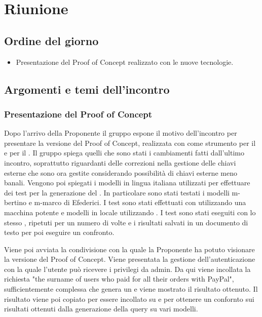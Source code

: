 \section{Riunione}
\subsection{Ordine del giorno}
\begin{itemize}
	\item Presentazione del Proof of Concept realizzato con le nuove tecnologie.
\end{itemize}

\subsection{Argomenti e temi dell'incontro}

\subsubsection{Presentazione del Proof of Concept}

\par Dopo l'arrivo della Proponente il gruppo espone il motivo dell'incontro per presentare la versione del Proof of Concept, realizzata con  come strumento per il  e  per il .
Il gruppo spiega quelli che sono stati i cambiamenti fatti dall'ultimo incontro, soprattutto riguardanti delle correzioni nella gestione delle chiavi esterne che sono ora gestite considerando possibilità di chiavi esterne meno banali.
Vengono poi spiegati i modelli in lingua italiana utilizzati per effettuare dei test per la generazione del . In particolare sono stati testati i modelli m-bertino e m-marco di Efederici. I test sono stati effettuati con  utilizzando una macchina potente e modelli in locale utilizzando . 
I test sono stati eseguiti con lo stesso , ripetuti per un numero di volte e i risultati salvati in un documento di testo per poi eseguire un confronto.

\par Viene poi avviata la condivisione con la quale la Proponente ha potuto visionare la versione del Proof of Concept. Viene presentata la gestione dell'autenticazione con la quale l'utente può ricevere i privilegi da admin. 
Da qui viene incollata la richiesta "the surname of users who paid for all their orders with PayPal", sufficientemente complessa che genera un  e viene mostrato il risultato ottenuto.
Il risultato viene poi copiato per essere incollato su  e  per ottenere un confornto sui risultati ottenuti dalla generazione della query su vari modelli.

